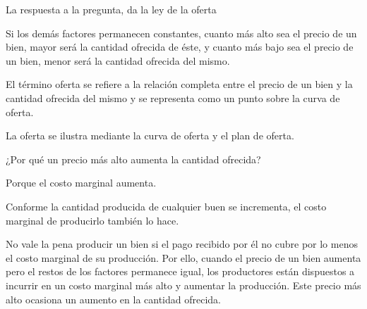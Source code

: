 La respuesta a la pregunta, da la ley de la oferta

\begin{definition}
    Si los demás factores permanecen constantes, cuanto más alto sea el precio de un bien, mayor será la cantidad ofrecida de éste, y cuanto más bajo sea el precio de un bien, menor será la cantidad ofrecida del mismo.
\end{definition}
El término oferta se refiere a la relación completa entre el precio de un bien y la cantidad ofrecida del mismo y se representa como un punto sobre la curva de oferta.

La oferta se ilustra mediante la curva de oferta y el plan de oferta.

¿Por qué un precio más alto aumenta la cantidad ofrecida?

Porque el costo marginal aumenta.

Conforme la cantidad producida de cualquier buen se incrementa, el costo marginal de producirlo también lo hace.

No vale la pena producir un bien si el pago recibido por él no cubre por lo menos el costo marginal de su producción. Por ello, cuando el precio de un bien aumenta pero el restos de los factores permanece igual, los productores están dispuestos a incurrir en un costo marginal más alto y aumentar la producción. Este precio más alto ocasiona un aumento en la cantidad ofrecida.

